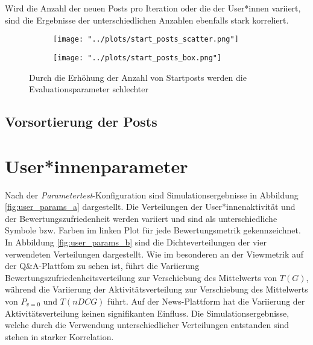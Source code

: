 Wird die Anzahl der neuen Posts pro Iteration oder die der User*innen variiert, sind die Ergebnisse der unterschiedlichen Anzahlen ebenfalls stark korreliert.

\begin{figure}[!h]
	\begin{subfigure}{0.5\textwidth}
		\texttt{[image: "../plots/start\_posts\_scatter.png"]}
	\end{subfigure}
	\begin{subfigure}{0.5\textwidth}
		\texttt{[image: "../plots/start\_posts\_box.png"]}
	\end{subfigure}
	\caption{Durch die Erhöhung der Anzahl von Startposts werden die Evaluationsparameter schlechter}
	\label{fig:start_posts}	
\end{figure}


\subsection{Vorsortierung der Posts}





\section{User*innenparameter}

Nach der \textit{Parametertest}-Konfiguration sind Simulationsergebnisse in Abbildung \ref{fig:user_params_a} dargestellt. Die Verteilungen der User*innenaktivität und der Bewertungszufriedenheit werden variiert und sind als unterschiedliche Symbole bzw. Farben im linken Plot für jede Bewertungsmetrik gekennzeichnet. In Abbildung  \ref{fig:user_params_b} sind die Dichteverteilungen der vier verwendeten Verteilungen dargestellt. Wie im besonderen an der Viewmetrik auf der Q\&A-Plattfom zu sehen ist, führt die Variierung Bewertungszufriedenheitsverteilung zur Verschiebung des Mittelwerts von $T(G)$, während die Variierung der Aktivitätsverteilung zur Verschiebung des Mittelwerts von $P_{v = 0}$ und $T(nDCG)$ führt. Auf der News-Plattform hat die Variierung der Aktivitätsverteilung keinen signifikanten Einfluss. Die Simulationsergebnisse, welche durch die Verwendung unterschiedlicher Verteilungen entstanden sind stehen in starker Korrelation. 

